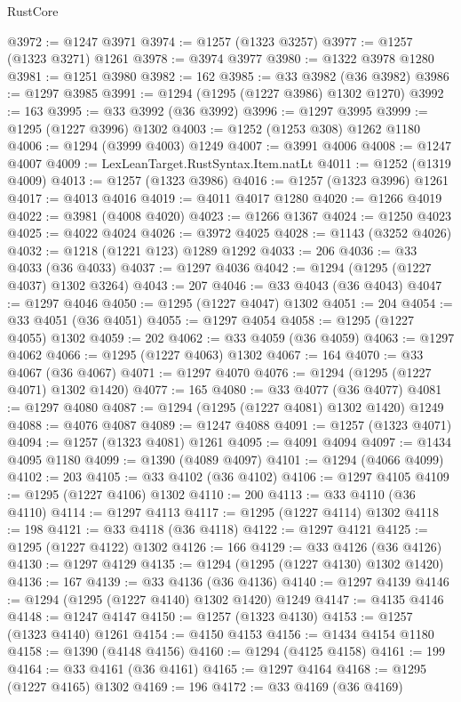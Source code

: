 \begin{lexlean}{RustCore}
\begin{coremodule}
@3972 := @1247 @3971
@3974 := @1257 (@1323 @3257)
@3977 := @1257 (@1323 @3271) @1261
@3978 := @3974 @3977
@3980 := @1322 @3978 @1280
@3981 := @1251 @3980
@3982 := 162
@3985 := @33 @3982 (@36 @3982)
@3986 := @1297 @3985
@3991 := @1294 (@1295 (@1227 @3986) @1302 @1270)
@3992 := 163
@3995 := @33 @3992 (@36 @3992)
@3996 := @1297 @3995
@3999 := @1295 (@1227 @3996) @1302
@4003 := @1252 (@1253 @308) @1262 @1180
@4006 := @1294 (@3999 @4003) @1249
@4007 := @3991 @4006
@4008 := @1247 @4007
@4009 := LexLeanTarget.RustSyntax.Item.natLt
@4011 := @1252 (@1319 @4009)
@4013 := @1257 (@1323 @3986)
@4016 := @1257 (@1323 @3996) @1261
@4017 := @4013 @4016
@4019 := @4011 @4017 @1280
@4020 := @1266 @4019
@4022 := @3981 (@4008 @4020)
@4023 := @1266 @1367
@4024 := @1250 @4023
@4025 := @4022 @4024
@4026 := @3972 @4025
@4028 := @1143 (@3252 @4026)
@4032 := @1218 (@1221 @123) @1289 @1292
@4033 := 206
@4036 := @33 @4033 (@36 @4033)
@4037 := @1297 @4036
@4042 := @1294 (@1295 (@1227 @4037) @1302 @3264)
@4043 := 207
@4046 := @33 @4043 (@36 @4043)
@4047 := @1297 @4046
@4050 := @1295 (@1227 @4047) @1302
@4051 := 204
@4054 := @33 @4051 (@36 @4051)
@4055 := @1297 @4054
@4058 := @1295 (@1227 @4055) @1302
@4059 := 202
@4062 := @33 @4059 (@36 @4059)
@4063 := @1297 @4062
@4066 := @1295 (@1227 @4063) @1302
@4067 := 164
@4070 := @33 @4067 (@36 @4067)
@4071 := @1297 @4070
@4076 := @1294 (@1295 (@1227 @4071) @1302 @1420)
@4077 := 165
@4080 := @33 @4077 (@36 @4077)
@4081 := @1297 @4080
@4087 := @1294 (@1295 (@1227 @4081) @1302 @1420) @1249
@4088 := @4076 @4087
@4089 := @1247 @4088
@4091 := @1257 (@1323 @4071)
@4094 := @1257 (@1323 @4081) @1261
@4095 := @4091 @4094
@4097 := @1434 @4095 @1180
@4099 := @1390 (@4089 @4097)
@4101 := @1294 (@4066 @4099)
@4102 := 203
@4105 := @33 @4102 (@36 @4102)
@4106 := @1297 @4105
@4109 := @1295 (@1227 @4106) @1302
@4110 := 200
@4113 := @33 @4110 (@36 @4110)
@4114 := @1297 @4113
@4117 := @1295 (@1227 @4114) @1302
@4118 := 198
@4121 := @33 @4118 (@36 @4118)
@4122 := @1297 @4121
@4125 := @1295 (@1227 @4122) @1302
@4126 := 166
@4129 := @33 @4126 (@36 @4126)
@4130 := @1297 @4129
@4135 := @1294 (@1295 (@1227 @4130) @1302 @1420)
@4136 := 167
@4139 := @33 @4136 (@36 @4136)
@4140 := @1297 @4139
@4146 := @1294 (@1295 (@1227 @4140) @1302 @1420) @1249
@4147 := @4135 @4146
@4148 := @1247 @4147
@4150 := @1257 (@1323 @4130)
@4153 := @1257 (@1323 @4140) @1261
@4154 := @4150 @4153
@4156 := @1434 @4154 @1180
@4158 := @1390 (@4148 @4156)
@4160 := @1294 (@4125 @4158)
@4161 := 199
@4164 := @33 @4161 (@36 @4161)
@4165 := @1297 @4164
@4168 := @1295 (@1227 @4165) @1302
@4169 := 196
@4172 := @33 @4169 (@36 @4169)

\end{coremodule}
\end{lexlean}
